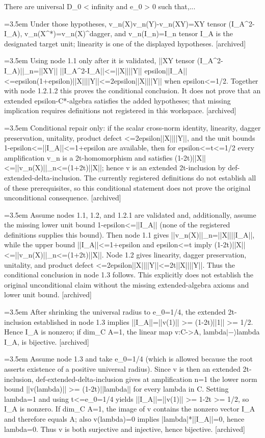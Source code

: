 \documentclass{article}
\newcommand{\step}[1]{\par\noindent\hangindent=3.5em\hangafter=1%
  \makebox[3.5em][l]{\textbf{#1.}}}
\newcommand{\steptag}[1]{\hfill{\small\textsf{[#1]}}}
\begin{document}
\begin{proofbox}{There are universal D\_0 < infinity and e\_0 > 0 such that,...}
\step{1.2.1.2} Under those hypotheses, v\_n(X)v\_n(Y)-v\_n(XY)=XY tensor (I\_A\textasciicircum{}2-I\_A), v\_n(X\textasciicircum{}*)=v\_n(X)\textasciicircum{}dagger, and v\_n(I\_n)=I\_n tensor I\_A is the designated target unit; linearity is one of the displayed hypotheses. \steptag{archived} \\[4pt]
\step{1.2.1.3} Using node 1.1 only after it is validated, ||XY tensor (I\_A\textasciicircum{}2-I\_A)||\_n=||XY|| ||I\_A\textasciicircum{}2-I\_A||<=||X||||Y|| epsilon||I\_A||<=epsilon(1+epsilon)||X||||Y||<=2epsilon||X||||Y|| when epsilon<=1/2. Together with node 1.2.1.2 this proves the conditional conclusion. It does not prove that an extended epsilon-C*-algebra satisfies the added hypotheses; that missing implication requires definitions not registered in this workspace. \steptag{archived} \\[4pt]
\step{1.3} Conditional repair only: if the scalar cross-norm identity, linearity, dagger preservation, unitality, product defect <=2epsilon||X||||Y||, and the unit bounds 1-epsilon<=||I\_A||<=1+epsilon are available, then for epsilon<=t<=1/2 every amplification v\_n is a 2t-homomorphism and satisfies (1-2t)||X||<=||v\_n(X)||\_n<=(1+2t)||X||; hence v is an extended 2t-inclusion by def-extended-delta-inclusion. The currently registered definitions do not establish all of these prerequisites, so this conditional statement does not prove the original unconditional consequence. \steptag{archived} \\[6pt]
\step{1.3.1} Assume nodes 1.1, 1.2, and 1.2.1 are validated and, additionally, assume the missing lower unit bound 1-epsilon<=||I\_A|| (none of the registered definitions supplies this bound). Then node 1.1 gives ||v\_n(X)||\_n=||X||||I\_A||, while the upper bound ||I\_A||<=1+epsilon and epsilon<=t imply (1-2t)||X||<=||v\_n(X)||\_n<=(1+2t)||X||. Node 1.2 gives linearity, dagger preservation, unitality, and product defect <=2epsilon||X||||Y||<=2t||X||||Y||. Thus the conditional conclusion in node 1.3 follows. This explicitly does not establish the original unconditional claim without the missing extended-algebra axioms and lower unit bound. \steptag{archived} \\[4pt]
\step{1.4} After shrinking the universal radius to e\_0=1/4, the extended 2t-inclusion established in node 1.3 implies ||I\_A||=||v(1)|| >= (1-2t)||1|| >= 1/2. Hence I\_A is nonzero; if dim\_C A=1, the linear map v:C->A, lambda$|-\rangle$lambda I\_A, is bijective. \steptag{archived} \\[6pt]
\step{1.4.1} Assume node 1.3 and take e\_0=1/4 (which is allowed because the root asserts existence of a positive universal radius). Since v is then an extended 2t-inclusion, def-extended-delta-inclusion gives at amplification n=1 the lower norm bound ||v(lambda)|| >= (1-2t)||lambda|| for every lambda in C. Setting lambda=1 and using t<=e\_0=1/4 yields ||I\_A||=||v(1)|| >= 1-2t >= 1/2, so I\_A is nonzero. If dim\_C A=1, the image of v contains the nonzero vector I\_A and therefore equals A; also v(lambda)=0 implies |lambda|*||I\_A||=0, hence lambda=0. Thus v is both surjective and injective, hence bijective. \steptag{archived} \\[4pt]

\end{proofbox}
\end{document}
